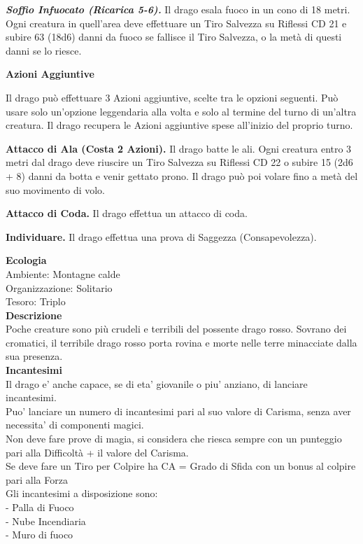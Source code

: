 \begin{multicols}{2}
\emph{\textbf{Soffio Infuocato (Ricarica 5-6).}} Il drago esala fuoco in un cono di 18 metri. Ogni creatura in quell'area deve effettuare un Tiro Salvezza su Riflessi CD 21 e subire 63 (18d6) danni da fuoco se fallisce il Tiro Salvezza, o la metà di questi danni se lo riesce.

\textbf{Azioni Aggiuntive}

Il drago può effettuare 3 Azioni aggiuntive, scelte tra le opzioni seguenti. Può usare solo un'opzione leggendaria alla volta e solo al termine del turno di un'altra creatura. Il drago recupera le Azioni aggiuntive spese all'inizio del proprio turno.

\textbf{Attacco di Ala (Costa 2 Azioni).} Il drago batte le ali. Ogni creatura entro 3 metri dal drago deve riuscire un Tiro Salvezza su Riflessi CD 22 o subire 15 (2d6 + 8) danni da botta e venir gettato prono. Il drago può poi volare fino a metà del suo movimento di volo. 

\textbf{Attacco di Coda.} Il drago effettua un attacco di coda. 

\textbf{Individuare.} Il drago effettua una prova di Saggezza (Consapevolezza).

\textbf{Ecologia}\\
Ambiente: Montagne calde\\
Organizzazione: Solitario\\
Tesoro: Triplo\\
\textbf{Descrizione}\\
Poche creature sono più crudeli e terribili del possente drago rosso. Sovrano dei cromatici, il terribile drago rosso porta rovina e morte nelle terre minacciate dalla sua presenza.\\
\textbf{Incantesimi}\\
Il drago e' anche capace, se di eta' giovanile o piu' anziano, di lanciare incantesimi.\\
Puo' lanciare un numero di incantesimi pari al suo valore di Carisma, senza aver necessita' di componenti magici.\\
Non deve fare prove di magia, si considera che riesca sempre con un punteggio pari alla Difficoltà + il valore del Carisma.\\
Se deve fare un Tiro per Colpire ha CA = Grado di Sfida con un bonus al colpire pari alla Forza\\
Gli incantesimi a disposizione sono:\\
- Palla di Fuoco\\
- Nube Incendiaria\\
- Muro di fuoco\\



\end{multicols}
